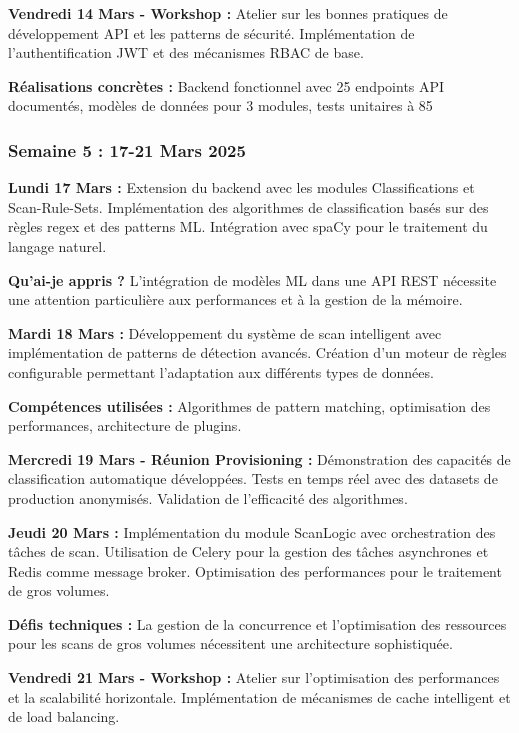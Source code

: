 \documentclass[a4paper,12pt]{article}
\begin{document}
\textbf{Vendredi 14 Mars - Workshop :}
Atelier sur les bonnes pratiques de développement API et les patterns de sécurité. Implémentation de l'authentification JWT et des mécanismes RBAC de base.

\textbf{Réalisations concrètes :} Backend fonctionnel avec 25 endpoints API documentés, modèles de données pour 3 modules, tests unitaires à 85%

\subsubsection{Semaine 5 : 17-21 Mars 2025}

\textbf{Lundi 17 Mars :}
Extension du backend avec les modules Classifications et Scan-Rule-Sets. Implémentation des algorithmes de classification basés sur des règles regex et des patterns ML. Intégration avec spaCy pour le traitement du langage naturel.

\textbf{Qu'ai-je appris ?} L'intégration de modèles ML dans une API REST nécessite une attention particulière aux performances et à la gestion de la mémoire.

\textbf{Mardi 18 Mars :}
Développement du système de scan intelligent avec implémentation de patterns de détection avancés. Création d'un moteur de règles configurable permettant l'adaptation aux différents types de données.

\textbf{Compétences utilisées :} Algorithmes de pattern matching, optimisation des performances, architecture de plugins.

\textbf{Mercredi 19 Mars - Réunion Provisioning :}
Démonstration des capacités de classification automatique développées. Tests en temps réel avec des datasets de production anonymisés. Validation de l'efficacité des algorithmes.

\textbf{Jeudi 20 Mars :}
Implémentation du module ScanLogic avec orchestration des tâches de scan. Utilisation de Celery pour la gestion des tâches asynchrones et Redis comme message broker. Optimisation des performances pour le traitement de gros volumes.

\textbf{Défis techniques :} La gestion de la concurrence et l'optimisation des ressources pour les scans de gros volumes nécessitent une architecture sophistiquée.

\textbf{Vendredi 21 Mars - Workshop :}
Atelier sur l'optimisation des performances et la scalabilité horizontale. Implémentation de mécanismes de cache intelligent et de load balancing.
\end{document}
